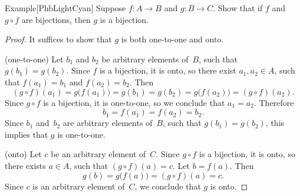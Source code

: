\documentclass[../MATH-2000-Notes.tex]{subfiles}
\begin{document}
\begin{commentbox}{Example}[{PhbLightCyan}]\label{ComposegBijEg}
    Suppose $f \colon A \to B$ and $g \colon B \to C$. Show that if $f$ and $g \circ f$ are bijections, then $g$ is a bijection.
\end{commentbox}

\begin{proof}
    It suffices to show that $g$ is both one-to-one and onto.

    (one-to-one) Let $b_1$ and $b_2$ be arbitrary elements of~$B$, such that $g(b_1) = g(b_2)$. Since $f$ is a bijection, it is onto, so there exist $a_1,a_2 \in A$, such that $f(a_1) = b_1$ and $f(a_2) = b_2$. Then
    $$ (g\circ f)(a_1) = g\bigl( f(a_1) \bigr) = g(b_1) = g(b_2) =g \bigl( f(a_2) \bigr) = (g \circ f)(a_2) .$$
    Since $g \circ f$ is a bijection, it is one-to-one, so we conclude that $a_1 = a_2$. Therefore
    $$ b_1 = f(a_1) = f(a_2) = b_2 .$$
    Since $b_1$ and~$b_2$ are arbitrary elements of~$B$, such that $g(b_1) = g(b_2)$, this implies that $g$ is one-to-one.

    (onto) Let $c$ be an arbitrary element of~$C$. Since $g \circ f$ is a bijection, it is onto, so there exists $a \in A$, such that $(g \circ f)(a) = c$. Let $b = f(a)$. Then
    $$ g(b) = g \bigl( f(a) \bigr) = (g \circ f)(a) = c .$$
    Since $c$ is an arbitrary element of~$C$, we conclude that $g$ is onto.
\end{proof}
\end{document}
